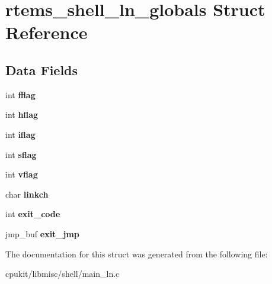 \hypertarget{structrtems__shell__ln__globals}{}\section{rtems\+\_\+shell\+\_\+ln\+\_\+globals Struct Reference}
\label{structrtems__shell__ln__globals}
\subsection*{Data Fields}
\begin{DoxyCompactItemize}
\item 
\mbox{\label{structrtems__shell__ln__globals_a06d02e0e7cda39ff642bc005287d5c9f}} 
int {\bfseries fflag}
\item 
\mbox{\label{structrtems__shell__ln__globals_accbfcb330a7e3061e152e092f72c2c4f}} 
int {\bfseries hflag}
\item 
\mbox{\label{structrtems__shell__ln__globals_a2146d0684153021c66884e35e3e13323}} 
int {\bfseries iflag}
\item 
\mbox{\label{structrtems__shell__ln__globals_ab8798170b31520205c76bfb883b29566}} 
int {\bfseries sflag}
\item 
\mbox{\label{structrtems__shell__ln__globals_a210e9115e10eb9dde9ebd7c457e83a40}} 
int {\bfseries vflag}
\item 
\mbox{\label{structrtems__shell__ln__globals_a9a87176ad0bba4af17c4641a61ab2ad3}} 
char {\bfseries linkch}
\item 
\mbox{\label{structrtems__shell__ln__globals_a959dc7ac321e2879eca33d29bd5a672a}} 
int {\bfseries exit\+\_\+code}
\item 
\mbox{\label{structrtems__shell__ln__globals_a4c14c8ae6082ed6e9976ec3e65a842b5}} 
jmp\+\_\+buf {\bfseries exit\+\_\+jmp}
\end{DoxyCompactItemize}


The documentation for this struct was generated from the following file\+:\begin{DoxyCompactItemize}
\item 
cpukit/libmisc/shell/main\+\_\+ln.\+c\end{DoxyCompactItemize}
